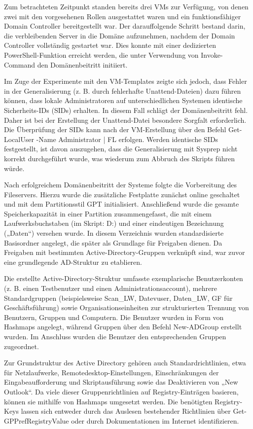 \documentclass[conference]{IEEEtran}
\begin{document}
Zum betrachteten Zeitpunkt standen bereits drei VMs zur Verfügung, von denen zwei mit den vorgesehenen Rollen ausgestattet waren und ein funktionsfähiger Domain Controller bereitgestellt war. Der darauffolgende Schritt bestand darin, die verbleibenden Server in die Domäne aufzunehmen, nachdem der Domain Controller vollständig gestartet war. Dies konnte mit einer dedizierten PowerShell-Funktion erreicht werden, die unter Verwendung von Invoke-Command den Domänenbeitritt initiiert.

Im Zuge der Experimente mit den VM-Templates zeigte sich jedoch, dass Fehler in der Generalisierung (z. B. durch fehlerhafte Unattend-Dateien) dazu führen können, dass lokale Administratoren auf unterschiedlichen Systemen identische Sicherheits-IDs (SIDs) erhalten. In diesem Fall schlägt der Domänenbeitritt fehl. Daher ist bei der Erstellung der Unattend-Datei besondere Sorgfalt erforderlich. Die Überprüfung der SIDs kann nach der VM-Erstellung über den Befehl Get-LocalUser -Name Administrator | FL erfolgen. Werden identische SIDs festgestellt, ist davon auszugehen, dass die Generalisierung mit Sysprep nicht korrekt durchgeführt wurde, was wiederum zum Abbruch des Skripts führen würde.

Nach erfolgreichem Domänenbeitritt der Systeme folgte die Vorbereitung des Fileservers. Hierzu wurde die zusätzliche Festplatte zunächst online geschaltet und mit dem Partitionsstil GPT initialisiert. Anschließend wurde die gesamte Speicherkapazität in einer Partition zusammengefasst, die mit einem Laufwerksbuchstaben (im Skript: D:) und einer eindeutigen Bezeichnung („Daten“) versehen wurde. In diesem Verzeichnis wurden standardisierte Basisordner angelegt, die später als Grundlage für Freigaben dienen. Da Freigaben mit bestimmten Active-Directory-Gruppen verknüpft sind, war zuvor eine grundlegende AD-Struktur zu etablieren.

Die erstellte Active-Directory-Struktur umfasste exemplarische Benutzerkonten (z. B. einen Testbenutzer und einen Administrationsaccount), mehrere Standardgruppen (beispielsweise Scan_LW, Datevuser, Daten_LW, GF für Geschäftsführung) sowie Organisationseinheiten zur strukturierten Trennung von Benutzern, Gruppen und Computern. Die Benutzer wurden in Form von Hashmaps angelegt, während Gruppen über den Befehl New-ADGroup erstellt wurden. Im Anschluss wurden die Benutzer den entsprechenden Gruppen zugeordnet.

Zur Grundstruktur des Active Directory gehören auch Standardrichtlinien, etwa für Netzlaufwerke, Remotedesktop-Einstellungen, Einschränkungen der Eingabeaufforderung und Skriptausführung sowie das Deaktivieren von „New Outlook“. Da viele dieser Gruppenrichtlinien auf Registry-Einträgen basieren, können sie mithilfe von Hashmaps umgesetzt werden. Die benötigten Registry-Keys lassen sich entweder durch das Auslesen bestehender Richtlinien über Get-GPPrefRegistryValue oder durch Dokumentationen im Internet identifizieren.
\end{document}
